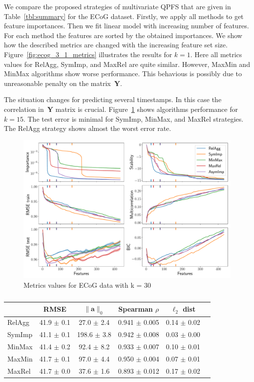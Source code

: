 \documentclass[12pt,oneside]{article}
\theoremstyle{definition}
\newcommand{\ba}{\mathbf{a}}
\newcommand{\bY}{\mathbf{Y}}
\begin{document}
\hrulefill

We compare the proposed strategies of multivariate QPFS that are given in Table~\ref{tbl:summary} for the ECoG dataset. 
Firstly, we apply all methods to get feature importances. 
Then we fit linear model with increasing number of features. 
For each method the features are sorted by the obtained importances. 
We show how the described metrics are changed with the increasing feature set size. 
Figure~\ref{fig:ecog_3_1_metrics} illustrates the results for $k = 1$. 
Here all metrics values for RelAgg, SymImp, and MaxRel are quite similar. 
However, MaxMin and MinMax algorithms show worse performance. 
This behavious is possibly due to unreasonable penalty on the matrix~$\bY$.

The situation changes for predicting several timestamps. 
In this case the correlation in~$\bY$ matrix is crucial. 
Figure~\ref{fig:ecog_3_15_metrics} shows algorithms performance for $k = 15$. 
The test error is minimal for SymImp, MinMax, and MaxRel strategies.  
The RelAgg strategy shows almost the worst error rate.

\begin{figure}[h]
	\includegraphics[width=\linewidth]{figs/ecog_3_30_metrics.pdf}
	\caption{Metrics values for ECoG data with k = 30}
	\label{fig:ecog_3_15_metrics}
\end{figure}
\begin{table}[]
	\caption{}
	\centering
	\begin{tabular}{l|ccccc}
		\hline
		& RMSE  & $\|\ba\|_0$ & Spearman $\rho$ & $\ell_2$ dist \\ \hline
		RelAgg & 41.9 $\pm$ 0.1 & 27.0 $\pm$ 2.4 & 0.941 $\pm$ 0.005 & 0.14 $\pm$ 0.02   \\
		SymImp & 41.1 $\pm$ 0.1 & 198.6 $\pm$ 3.8 & 0.942 $\pm$ 0.008 & 0.03 $\pm$ 0.00   \\
		MinMax & 41.4 $\pm$ 0.2 & 92.4 $\pm$ 8.2 & 0.933 $\pm$ 0.007 & 0.10 $\pm$ 0.01   \\
		MaxMin & 41.7 $\pm$ 0.1 & 97.0 $\pm$ 4.4 & 0.950 $\pm$ 0.004 & 0.07 $\pm$ 0.01   \\
		MaxRel & 41.7 $\pm$ 0.0 & 37.6 $\pm$ 1.6 & 0.893 $\pm$ 0.012 & 0.17 $\pm$ 0.02  \\ \hline
	\end{tabular}
	\label{tbl:stability}
\end{table}
\end{document}

